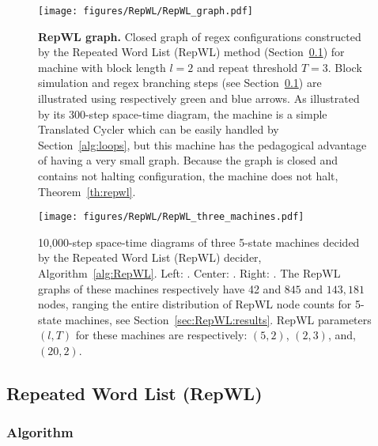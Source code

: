 
\newpage



\begin{figure}[h!]
    \centering
    \texttt{[image: figures/RepWL/RepWL\_graph.pdf]}
    \caption{{\small \textbf{RepWL graph.} Closed graph of regex configurations constructed by the Repeated Word List (RepWL) method (Section~\ref{sec:RepWL}) for machine  with block length $l=2$ and repeat threshold $T=3$. Block simulation and regex branching steps (see Section~\ref{sec:RepWL}) are illustrated using respectively green and blue arrows. As illustrated by its 300-step space-time diagram, the machine is a simple Translated Cycler which can be easily handled by Section~\ref{alg:loops}, but this machine has the pedagogical advantage of having a very small graph. Because the graph is closed and contains not halting configuration, the machine does not halt, Theorem~\ref{th:repwl}.}}\label{fig:repWL}
\end{figure}

\begin{figure}[h!]
    \centering
    \texttt{[image: figures/RepWL/RepWL\_three\_machines.pdf]}
    \caption{10,000-step space-time diagrams of three 5-state machines decided by the Repeated Word List (RepWL) decider, Algorithm~\ref{alg:RepWL}. Left: {\small {}}. Center: {\small {}}. Right: {\small {}}. The RepWL graphs of these machines respectively have 42 and $845$ and $143{,}181$ nodes, ranging the entire distribution of RepWL node counts for 5-state machines, see Section~\ref{sec:RepWL:results}. RepWL parameters $(l,T)$ for these machines are respectively: $(5,2)$, $(2,3)$, and, $(20,2)$.
    }\label{fig:repWLThree}
\end{figure}

\subsection{Repeated Word List (RepWL)}\label{sec:RepWL}

\subsubsection{Algorithm}

